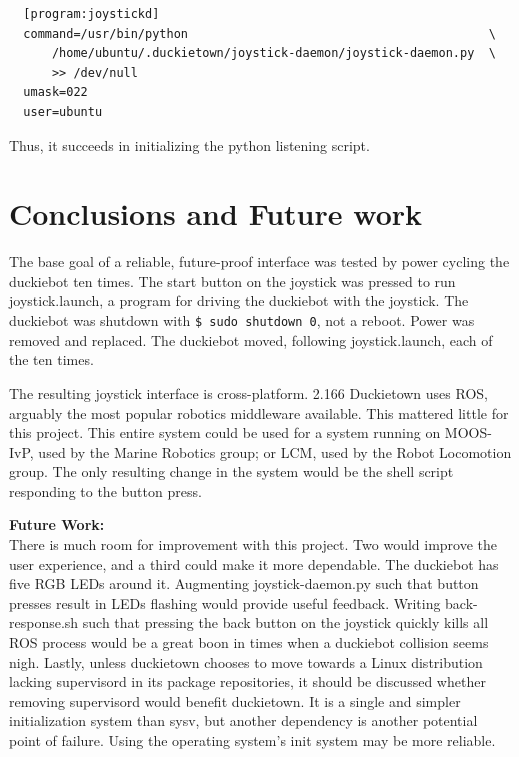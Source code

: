 \documentclass[titlepage]{article}
\begin{document}
\begin{lstlisting}
  [program:joystickd]
  command=/usr/bin/python                                          \
      /home/ubuntu/.duckietown/joystick-daemon/joystick-daemon.py  \
      >> /dev/null
  umask=022
  user=ubuntu
\end{lstlisting}

Thus, it succeeds in initializing the python listening script. 


\section{Conclusions and Future work}
The base goal of a reliable, future-proof interface was tested by power cycling the duckiebot ten times. The start button on the joystick was pressed to run joystick.launch, a program for driving the duckiebot with the joystick. The duckiebot was shutdown with \texttt{\$ sudo shutdown 0}, not a reboot. Power was removed and replaced. The duckiebot moved, following joystick.launch, each of the ten times. 

The resulting joystick interface is cross-platform. 2.166 Duckietown uses ROS, arguably the most popular robotics middleware available. This mattered little for this project. This entire system could be used for a system running on MOOS-IvP, used by the Marine Robotics group; or LCM, used by the Robot Locomotion group. The only resulting change in the system would be the shell script responding to the button press. 

\textbf{Future Work:} \\
There is much room for improvement with this project. Two would improve the user experience, and a third could make it more dependable. 
The duckiebot has five RGB LEDs around it. Augmenting joystick-daemon.py such that button presses result in LEDs flashing would provide useful feedback. 
Writing back-response.sh such that pressing the back button on the joystick quickly kills all ROS process would be a great boon in times when a duckiebot collision seems nigh. 
Lastly, unless duckietown chooses to move towards a Linux distribution lacking supervisord in its package repositories, it should be discussed whether removing supervisord would benefit duckietown. It is a single and simpler initialization system than sysv, but another dependency is another potential point of failure. Using the operating system's init system may be more reliable. 
\end{document}
